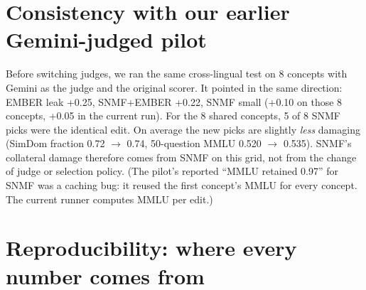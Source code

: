 \documentclass[11pt]{article}
\begin{document}
\section{Consistency with our earlier Gemini-judged pilot}\label{app:D}
\setcounter{table}{0}

Before switching judges, we ran the same cross-lingual test on 8 concepts with Gemini as the judge and the original scorer. It pointed in the same direction: EMBER leak +0.25, SNMF+EMBER +0.22, SNMF small (+0.10 on those 8 concepts, +0.05 in the current run). For the 8 shared concepts, 5 of 8 SNMF picks were the identical edit. On average the new picks are slightly \emph{less} damaging (SimDom fraction 0.72 $\rightarrow$ 0.74, 50-question MMLU 0.520 $\rightarrow$ 0.535). SNMF's collateral damage therefore comes from SNMF on this grid, not from the change of judge or selection policy. (The pilot's reported ``MMLU retained 0.97'' for SNMF was a caching bug: it reused the first concept's MMLU for every concept. The current runner computes MMLU per edit.)

\section{Reproducibility: where every number comes from}\label{app:E}
\setcounter{table}{0}
\end{document}
